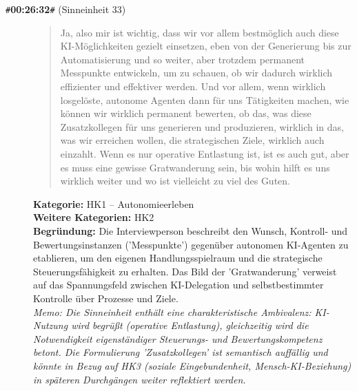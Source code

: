 \begin{description}
  \item[\texttt{\#}\textbf{00:26:32}\texttt{\#} (Sinneinheit 33)]
  \begin{quote}
  Ja, also mir ist wichtig, dass wir vor allem bestmöglich auch diese KI-Möglichkeiten gezielt einsetzen, eben von der Generierung bis zur Automatisierung und so weiter, aber trotzdem permanent Messpunkte entwickeln, um zu schauen, ob wir dadurch wirklich effizienter und effektiver werden. Und vor allem, wenn wirklich losgelöste, autonome Agenten dann für uns Tätigkeiten machen, wie können wir wirklich permanent bewerten, ob das, was diese Zusatzkollegen für uns generieren und produzieren, wirklich in das, was wir erreichen wollen, die strategischen Ziele, wirklich auch einzahlt. Wenn es nur operative Entlastung ist, ist es auch gut, aber es muss eine gewisse Gratwanderung sein, bis wohin hilft es uns wirklich weiter und wo ist vielleicht zu viel des Guten.
  \end{quote}
  \textbf{Kategorie:} HK1 -- Autonomieerleben\\
  \textbf{Weitere Kategorien:} HK2\\
  \textbf{Begr\"undung:} Die Interviewperson beschreibt den Wunsch, Kontroll- und Bewertungsinstanzen ('Messpunkte') gegenüber autonomen KI-Agenten zu etablieren, um den eigenen Handlungsspielraum und die strategische Steuerungsfähigkeit zu erhalten. Das Bild der 'Gratwanderung' verweist auf das Spannungsfeld zwischen KI-Delegation und selbstbestimmter Kontrolle über Prozesse und Ziele.
  \\\textit{Memo: Die Sinneinheit enthält eine charakteristische Ambivalenz: KI-Nutzung wird begrüßt (operative Entlastung), gleichzeitig wird die Notwendigkeit eigenständiger Steuerungs- und Bewertungskompetenz betont. Die Formulierung 'Zusatzkollegen' ist semantisch auffällig und könnte in Bezug auf HK3 (soziale Eingebundenheit, Mensch-KI-Beziehung) in späteren Durchgängen weiter reflektiert werden.}
\end{description}
\medskip

